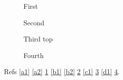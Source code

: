 \documentclass{article}
\begin{document}
\begin{figure}
\caption{First}\label{f1}
\end{figure}
\begin{figure}
\caption{Second}\label{f2}
\end{figure}
\begin{figure}
\caption{Third top}\label{f3}
\end{figure}
\begin{figure}
\caption{Fourth}\label{f4}
\end{figure}
Refs \ref{a1} \ref{a2} \ref{f1} \ref{b1} \ref{b2} \ref{f2} \ref{c1} \ref{f3} \ref{d1} \ref{f4}.
\end{document}
